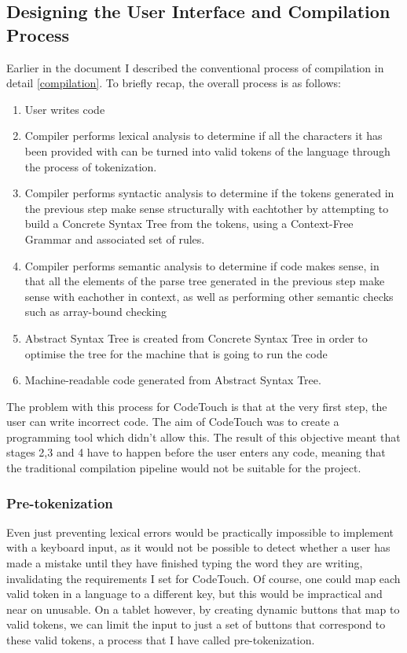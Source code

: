 \documentclass[ %
                    author={Jonathan Rankin},
                supervisor={Dr. David May, Dr. Ian Holyer},
                    degree={MEng},
                     title={CodeTouch},
                  subtitle={A Revolutionary Way To Program Real Code On Touch Screen Devices},
                      type={enterprise},
                      year={2015 } ]{dissertation}
\begin{document}
\subsection{Designing the User Interface and Compilation Process}

Earlier in the document I described the conventional process of compilation in detail \ref{compilation}. To briefly recap, the overall process is as follows:

\begin{enumerate}
\item User writes code
\item Compiler performs lexical analysis to determine if all the characters it has been provided with can be turned into valid tokens of the language through the process of tokenization. 
\item Compiler performs syntactic analysis to determine if the tokens generated in the previous step make sense structurally with eachtother by attempting to build a Concrete Syntax Tree from the tokens, using a Context-Free Grammar and associated set of rules. 
\item Compiler performs semantic analysis to determine if code makes sense, in that all the elements of the parse tree generated in the previous step make sense with eachother in context, as well as performing other semantic checks such as array-bound checking
\item Abstract Syntax Tree is created from Concrete Syntax Tree in order to optimise the tree for the machine that is going to run the code
\item Machine-readable code generated from Abstract Syntax Tree. 


\end{enumerate}

The problem with this process for CodeTouch is that at the very first step, the user can write incorrect code. The aim of CodeTouch was to create a programming tool which didn't allow this. The result of this objective meant that stages 2,3 and 4 have to happen before the user enters any code, meaning that the traditional compilation pipeline would not be suitable for the project. 

\subsubsection{Pre-tokenization}

Even just preventing lexical errors would be practically impossible to implement with a keyboard input, as it would not be possible to detect whether a user has made a mistake until they have finished typing the word they are writing, invalidating the requirements I set for CodeTouch. Of course, one could map each valid token in a language to a different key, but this would be impractical and near on unusable. On a tablet however, by creating dynamic buttons that map to valid tokens, we can limit the input to just a set of buttons that correspond to these valid tokens, a process that I have called pre-tokenization.
\end{document}
